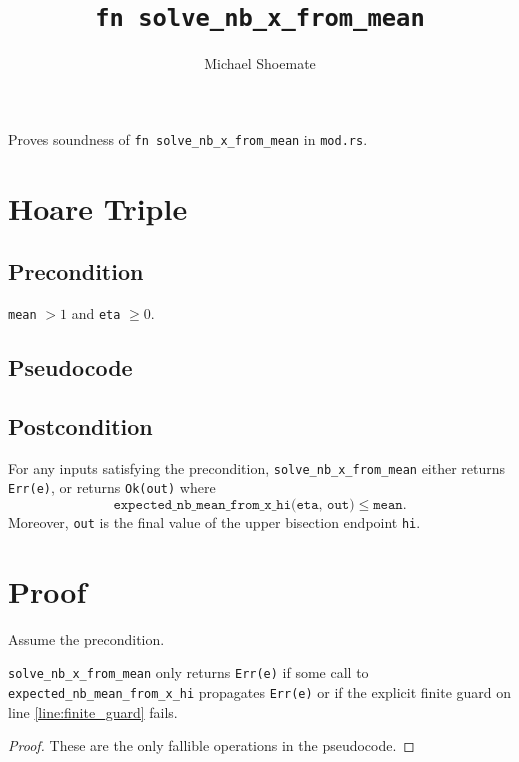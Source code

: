 \documentclass{article}
\title{\texttt{fn solve\_nb\_x\_from\_mean}}
\author{Michael Shoemate}
\begin{document}
\maketitle

Proves soundness of \texttt{fn solve\_nb\_x\_from\_mean} in \texttt{mod.rs}.

\section{Hoare Triple}
\subsection*{Precondition}
\texttt{mean} $> 1$ and \texttt{eta} $\ge 0$.

\subsection*{Pseudocode}


\subsection*{Postcondition}
\begin{theorem}
\label{postcondition}
For any inputs satisfying the precondition, \texttt{solve\_nb\_x\_from\_mean} either returns
\texttt{Err(e)}, or returns \texttt{Ok(out)} where
\[
\texttt{expected\_nb\_mean\_from\_x\_hi(eta, out)} \le \texttt{mean}.
\]
Moreover, \texttt{out} is the final value of the upper bisection endpoint \texttt{hi}.
\end{theorem}

\section{Proof}
Assume the precondition.

\begin{lemma}
\label{err-e}
\texttt{solve\_nb\_x\_from\_mean} only returns \texttt{Err(e)} if some call to
\texttt{expected\_nb\_mean\_from\_x\_hi} propagates \texttt{Err(e)} or if the explicit finite
guard on line \ref{line:finite_guard} fails.
\end{lemma}

\begin{proof}
These are the only fallible operations in the pseudocode.
\end{proof}
\end{document}

